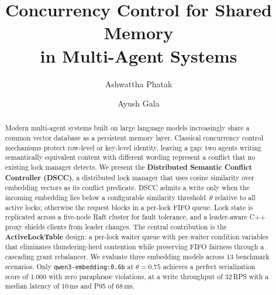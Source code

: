 \documentclass[sigconf]{acmart}
\begin{document}
\title{Concurrency Control for Shared Memory\\in Multi-Agent Systems}

\author{Ashwattha Phatak}

\author{Ayush Gala}

\begin{abstract}
Modern multi-agent systems built on large language models increasingly share a common
vector database as a persistent memory layer. Classical concurrency control mechanisms
protect row-level or key-level identity, leaving a gap: two agents writing semantically
equivalent content with different wording represent a conflict that no existing lock
manager detects. We present the \textbf{Distributed Semantic Conflict Controller (DSCC)},
a distributed lock manager that uses cosine similarity over embedding vectors as its
conflict predicate. DSCC admits a write only when the incoming embedding lies below a
configurable similarity threshold~$\theta$ relative to all active locks; otherwise the
request blocks in a per-lock FIFO queue. Lock state is replicated across a five-node Raft
cluster for fault tolerance, and a leader-aware C++ proxy shields clients from leader
changes. The central contribution is the \textbf{ActiveLockTable} design: a per-lock
waiter queue with per-waiter condition variables that eliminates thundering-herd
contention while preserving FIFO fairness through a cascading grant rebalancer. We
evaluate three embedding models across 13 benchmark scenarios. Only
\texttt{qwen3-embedding:0.6b} at $\theta{=}0.75$ achieves a perfect serialization score
of 1.000 with zero paraphrase violations, at a write throughput of 32\,RPS with a median
latency of 10\,ms and P95 of 68\,ms.
\end{abstract}


\maketitle

\end{document}
